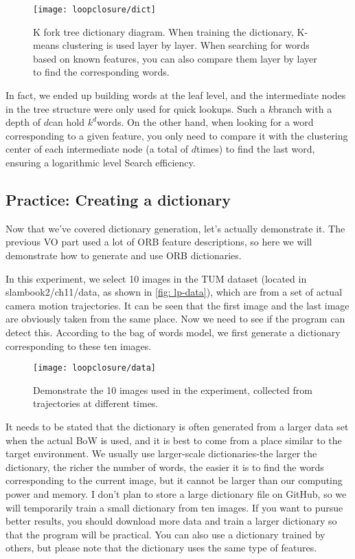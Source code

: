 \begin{figure}[! ht]
\centering
\texttt{[image: loopclosure/dict]}
\caption{K fork tree dictionary diagram. When training the dictionary, K-means clustering is used layer by layer. When searching for words based on known features, you can also compare them layer by layer to find the corresponding words. }
\label{fig: lp-dict}
\end{figure}

In fact, we ended up building words at the leaf level, and the intermediate nodes in the tree structure were only used for quick lookups. Such a $k $branch with a depth of $d $can hold $k ^ d $words. On the other hand, when looking for a word corresponding to a given feature, you only need to compare it with the clustering center of each intermediate node (a total of $d $times) to find the last word, ensuring a logarithmic level Search efficiency.

\subsection{Practice: Creating a dictionary}
Now that we've covered dictionary generation, let's actually demonstrate it. The previous VO part used a lot of ORB feature descriptions, so here we will demonstrate how to generate and use ORB dictionaries.

In this experiment, we select 10 images in the TUM dataset (located in slambook2/ch11/data, as shown in \autoref{fig: lp-data}), which are from a set of actual camera motion trajectories. It can be seen that the first image and the last image are obviously taken from the same place. Now we need to see if the program can detect this. According to the bag of words model, we first generate a dictionary corresponding to these ten images.

\begin{figure}[! htp]
\centering
\texttt{[image: loopclosure/data]}
\caption{Demonstrate the 10 images used in the experiment, collected from trajectories at different times. }
\label{fig: lp-data}
\end{figure}

It needs to be stated that the dictionary is often generated from a larger data set when the actual BoW is used, and it is best to come from a place similar to the target environment. We usually use larger-scale dictionaries-the larger the dictionary, the richer the number of words, the easier it is to find the words corresponding to the current image, but it cannot be larger than our computing power and memory. I don't plan to store a large dictionary file on GitHub, so we will temporarily train a small dictionary from ten images. If you want to pursue better results, you should download more data and train a larger dictionary so that the program will be practical. You can also use a dictionary trained by others, but please note that the dictionary uses the same type of features.

